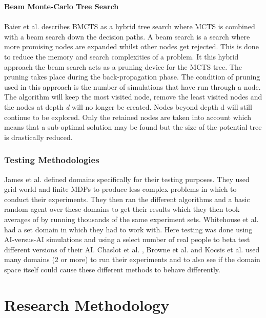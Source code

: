 \documentclass[journal]{IEEEtran}
\begin{document}
  
  \textbf{Beam Monte-Carlo Tree Search}\\\\
  Baier et al. \cite{BEAM} describes BMCTS as a hybrid tree search where MCTS is combined with a beam search down the decision paths. A beam search is a search where more promising nodes are expanded whilst other nodes get rejected. This is done to reduce the memory and search complexities of a problem. It this hybrid approach the beam search acts as a pruning device for the MCTS tree. The pruning takes place during the back-propagation phase. The condition of pruning used in this approach is the number of simulations that have run through a node. The algorithm will keep the most visited node, remove the least visited nodes and the nodes at depth \emph{d} will no longer be created. Nodes beyond depth d will still continue to be explored. Only the retained nodes are taken into account which means that a sub-optimal solution may be found but the size of the potential tree is drastically reduced.\\

  \subsubsection{Testing Methodologies}
  \label{testing}
  James et al. \cite{wits} defined domains specifically for their testing purposes. They used grid world and finite MDPs to produce less complex problems in which to conduct their experiments. They then ran the different algorithms and a basic random agent over these domains to get their results which they then took averages of by running thousands of the same experiment sets.  Whitehouse et al. \cite{knowledge} had a set domain in which they had to work with. Here testing was done using AI-versus-AI simulations and using a select number of real people to beta test different versions of their AI. Chaslot et al. \cite{progressive}, Browne et al. \cite{survey} and Kocsis et al. \cite{bandit} used many domains (2 or more) to run their experiments and to also see if the domain space itself could cause these different methods to behave differently.\\
  
  \section{Research Methodology}
\end{document}
